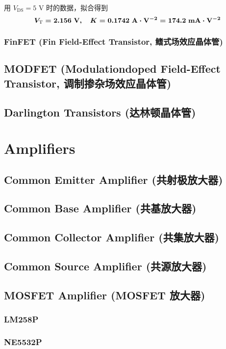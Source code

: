 \documentclass[UTF8]{report}
\begin{document}
用 $V_\text{DS} = 5$ V 时的数据，拟合得到
\begin{equation}
    \boldmath 
    V_\text{T} = 2.156 \ \mathrm{V},\quad K = 0.1742 \ \mathrm{A\cdot V^{-2}} = 174.2 \ \mathrm{mA\cdot V^{-2}}
\end{equation}

\subsection{FinFET (Fin Field-Effect Transistor, 鳍式场效应晶体管)}

\section{MODFET (Modulationdoped Field-Effect Transistor, 调制掺杂场效应晶体管) }
\section{Darlington Transistors (达林顿晶体管)}

\chapter{Amplifiers}\thispagestyle{fancy}
\section{Common Emitter Amplifier (共射极放大器)}
\section{Common Base Amplifier (共基放大器)}
\section{Common Collector Amplifier (共集放大器)}
\section{Common Source Amplifier (共源放大器)}
\section{MOSFET Amplifier (MOSFET 放大器)}

\subsection{LM258P}
\subsection{NE5532P}
\end{document}
